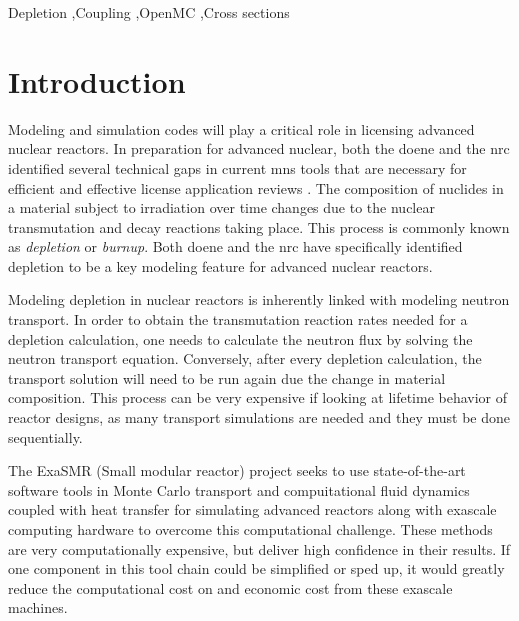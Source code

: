 \documentclass[a4paper,fleqn]{cas-dc}
\begin{document}
\begin{keywords}
 Depletion \sep Coupling \sep OpenMC \sep Cross sections
\end{keywords}


\maketitle

\section{Introduction}\label{}
    Modeling and simulation codes will play a critical role in licensing
    advanced nuclear reactors. In preparation for advanced nuclear, both the
    \Gls{doene} and the \Gls{nrc} identified several technical gaps in current
    \Gls{mns} tools that are necessary for efficient and effective license
    application reviews \cite{betzler_modeling_2019} \cite{usnrc_nonlwr_2020-1}.
    The composition of nuclides in a material subject to irradiation over time
    changes due to the nuclear transmutation and decay reactions taking place.
    This process is commonly known as {\it depletion} or {\it burnup}.  Both
    \Gls{doene} and the \Gls{nrc} have specifically identified depletion to be a
    key modeling feature for advanced nuclear reactors.
    
    Modeling depletion in nuclear reactors is inherently linked with modeling
    neutron transport. In order to obtain the transmutation reaction rates
    needed for a depletion calculation, one needs to calculate the neutron flux
    by solving the neutron transport equation. Conversely, after every depletion
    calculation, the transport solution will need  to be run again due the
    change in material composition. This process can be very expensive if
    looking at lifetime behavior of reactor designs, as many transport
    simulations are needed and they must be done sequentially.

    The ExaSMR (Small modular reactor) project seeks to use state-of-the-art
    software tools in Monte Carlo transport and compuitational fluid dynamics
    coupled with heat transfer for simulating advanced reactors along with
    exascale computing hardware to overcome this computational challenge. These
    methods are very computationally expensive, but deliver high confidence in
    their results. If one component in this tool chain could be simplified or
    sped up, it would greatly reduce the computational cost on and economic cost
    from these exascale machines.
\end{document}
